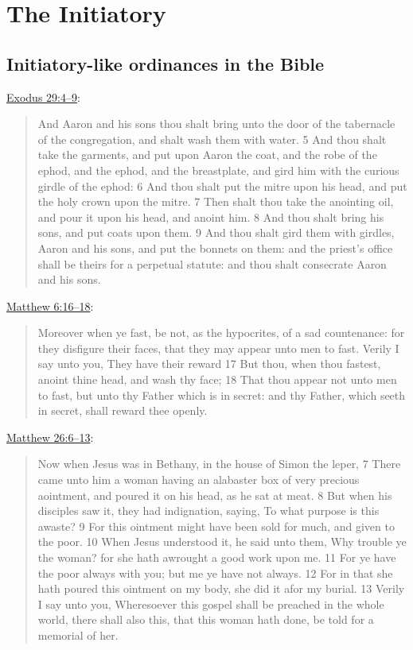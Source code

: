 \section{The Initiatory}
	\label{TEMPLE-ENDOWMENT-INIT}

	\subsection{Initiatory-like ordinances in the Bible}
	
		\hyperref[EXODUS-29-4]{Exodus 29:4--9}:
		
			\begin{quote}
				And Aaron and his sons thou shalt bring unto the door of the tabernacle of the congregation, and shalt wash them with water. 5 And thou shalt take the garments, and put upon Aaron the coat, and the robe of the ephod, and the ephod, and the breastplate, and gird him with the curious girdle of the ephod: 6 And thou shalt put the mitre upon his head, and put the holy crown upon the mitre. 7 Then shalt thou take the anointing oil, and pour it upon his head, and anoint him. 8 And thou shalt bring his sons, and put coats upon them. 9 And thou shalt gird them with girdles, Aaron and his sons, and put the bonnets on them: and the priest's office shall be theirs for a perpetual statute: and thou shalt consecrate Aaron and his sons.
			\end{quote}
			
		\hyperref[MATTHEW-6-16]{Matthew 6:16--18}:
		
			\begin{quote}
				Moreover when ye fast, be not, as the hypocrites, of a sad countenance: for they disfigure their faces, that they may appear unto men to fast. Verily I say unto you, They have their reward 17 But thou, when thou fastest, anoint thine head, and wash thy face; 18 That thou appear not unto men to fast, but unto thy Father which is in secret: and thy Father, which seeth in secret, shall reward thee openly.
			\end{quote}
			
		\hyperref[MATTHEW-26-6]{Matthew 26:6--13}:
		
			\begin{quote}
				Now when Jesus was in Bethany, in the house of Simon the leper, 7 There came unto him a woman having an alabaster box of very precious aointment, and poured it on his head, as he sat at meat. 8 But when his disciples saw it, they had indignation, saying, To what purpose is this awaste? 9 For this ointment might have been sold for much, and given to the poor. 10 When Jesus understood it, he said unto them, Why trouble ye the woman? for she hath awrought a good work upon me. 11 For ye have the poor always with you; but me ye have not always. 12 For in that she hath poured this ointment on my body, she did it afor my burial. 13 Verily I say unto you, Wheresoever this gospel shall be preached in the whole world, there shall also this, that this woman hath done, be told for a memorial of her. 
			\end{quote}
			
